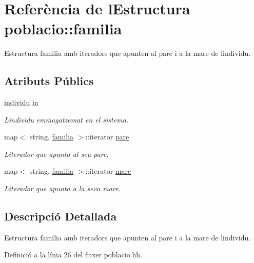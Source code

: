 \hypertarget{structpoblacio_1_1familia}{}\section{Referència de l\textquotesingle{}Estructura poblacio\+:\+:familia}
\label{structpoblacio_1_1familia}


Estructura familia amb iteradors que apunten al pare i a la mare de l\textquotesingle{}individu.  


\subsection*{Atributs Públics}
\begin{DoxyCompactItemize}
\item 
\hyperlink{classindividu}{individu} \hyperlink{structpoblacio_1_1familia_a184e9fe52d7cf62ca133ac1d900f87ea}{in}
\begin{DoxyCompactList}\small\item\em L\textquotesingle{}individu emmagatzemat en el sistema. \end{DoxyCompactList}\item 
map$<$ string, \hyperlink{structpoblacio_1_1familia}{familia} $>$\+::iterator \hyperlink{structpoblacio_1_1familia_af87f56b016ade8b4bb02a49036de5f74}{pare}
\begin{DoxyCompactList}\small\item\em L\textquotesingle{}iterador que apunta al seu pare. \end{DoxyCompactList}\item 
map$<$ string, \hyperlink{structpoblacio_1_1familia}{familia} $>$\+::iterator \hyperlink{structpoblacio_1_1familia_a9d44bf543d7f856a93feac40de233c42}{mare}
\begin{DoxyCompactList}\small\item\em L\textquotesingle{}iterador que apunta a la seva mare. \end{DoxyCompactList}\end{DoxyCompactItemize}


\subsection{Descripció Detallada}
Estructura familia amb iteradors que apunten al pare i a la mare de l\textquotesingle{}individu. 

Definició a la línia 26 del fitxer poblacio.\+hh.



